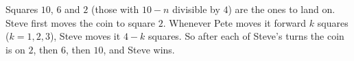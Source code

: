 Squares $10$, $6$ and $2$ (those with $10-n$ divisible by $4$) are the ones to land on. Steve first moves the coin to square $2$. Whenever Pete moves it forward $k$ squares ($k=1,2,3$), Steve moves it $4-k$ squares. So after each of Steve's turns the coin is on $2$, then $6$, then $10$, and Steve wins.
